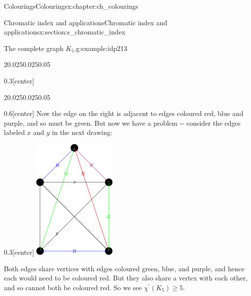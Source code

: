 \documentclass[oneside,10pt,]{book}
\numberwithin{equation}{section}
\begin{document}
\begin{chapterptx}{Colourings}{}{Colourings}{}{}{x:chapter:ch_colourings}
\begin{sectionptx}{Chromatic index and applications}{}{Chromatic index and applications}{}{}{x:section:s_chromatic_index}
\begin{example}{The complete graph \(K_5\).}{g:example:idp213}
\begin{sidebyside}{2}{0.025}{0.025}{0.05}
\begin{sbspanel}{0.3}[center]
\end{sbspanel}%
\end{sidebyside}%
\begin{sidebyside}{2}{0.025}{0.025}{0.05}%
\begin{sbspanel}{0.6}[center]%
Now the edge on the right is adjacent to edges coloured red, blue and purple, and so must be green.  But now we have a problem -{}-{} consider the edges labeled \(x\) and \(y\) in the next drawing:%
\end{sbspanel}%
\begin{sbspanel}{0.3}[center]%
\includegraphics[width=\linewidth]{images/K5EdgeColouring2.png}
\end{sbspanel}%
\end{sidebyside}%
Both edges share vertices with edges coloured green, blue, and purple, and hence each would need to be coloured red.  But they also share a vertex with each other, and so cannot both be coloured red.  So we see \(\chi^\prime(K_5)\geq 5\).%

\end{example}
\end{sectionptx}
\end{chapterptx}
\end{document}
